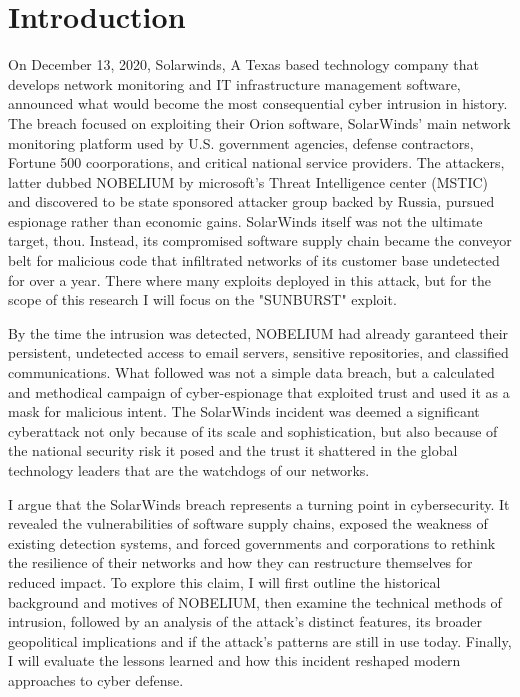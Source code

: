 \documentclass[conference]{IEEEtran}
\begin{document}
\section{Introduction}
On December 13, 2020, Solarwinds, A Texas based technology company that develops network monitoring and IT 
infrastructure management software, announced what would become the most consequential cyber intrusion in history.
The breach focused on exploiting their Orion software, SolarWinds' main network monitoring platform used by U.S. 
government agencies, defense contractors, Fortune 500 coorporations, and critical national service providers. 
The attackers, latter dubbed NOBELIUM by microsoft's Threat Intelligence center (MSTIC) and discovered to be
state sponsored attacker group backed by Russia, pursued espionage rather than economic gains.
SolarWinds itself was not the ultimate target, thou. Instead, its compromised software supply chain became the conveyor belt for malicious 
code that infiltrated networks of its customer base undetected for over a year. There where many exploits deployed in this attack, but for the 
scope of this research I will focus on the "SUNBURST" exploit.

By the time the intrusion was detected, NOBELIUM had already garanteed their persistent, undetected access to email servers,
sensitive repositories, and classified communications. What followed was not a simple data breach, but a calculated and methodical 
campaign of cyber-espionage that exploited trust and used it as a mask for malicious intent. The SolarWinds incident was deemed a 
significant cyberattack not only because of its scale and sophistication, but also because of the national security risk it posed and 
the trust it shattered in the global technology leaders that are the watchdogs of our networks.

I argue that the SolarWinds breach represents a turning point in cybersecurity. It revealed the vulnerabilities of software supply 
chains, exposed the weakness of existing detection systems, and forced governments and corporations to rethink the resilience of their 
networks and how they can restructure themselves for reduced impact. To explore this claim, I will first outline the historical 
background and motives of NOBELIUM, then examine the technical methods of intrusion, followed by an analysis of the attack's distinct 
features, its broader geopolitical implications and if the attack's patterns are still in use today. Finally, I will evaluate the lessons 
learned and how this incident reshaped modern approaches to cyber defense.
\end{document}
